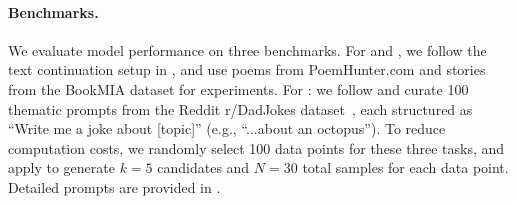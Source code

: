 \paragraph{Benchmarks.} We evaluate model performance on three benchmarks. For  and , we follow the text continuation  setup in \citet{lu2025aihumanityssalieriquantifying}, and use poems from PoemHunter.com and stories from the BookMIA dataset \citep{shi2024detectingpretrainingdatalarge} for experiments.
For : we follow \citet{turgeman2025jokeruleallimpossibility} and curate 100 thematic prompts from the Reddit r/DadJokes dataset~\citep{reddit_dad_jokes_2023}, each structured as ``Write me a joke about [topic]'' (e.g., ``...about an octopus''). 
To reduce computation costs, we randomly select 100 data points for these three tasks, and apply \ourslower to generate $k=5$ candidates and $N=30$ total samples for each data point. Detailed prompts are provided in .


